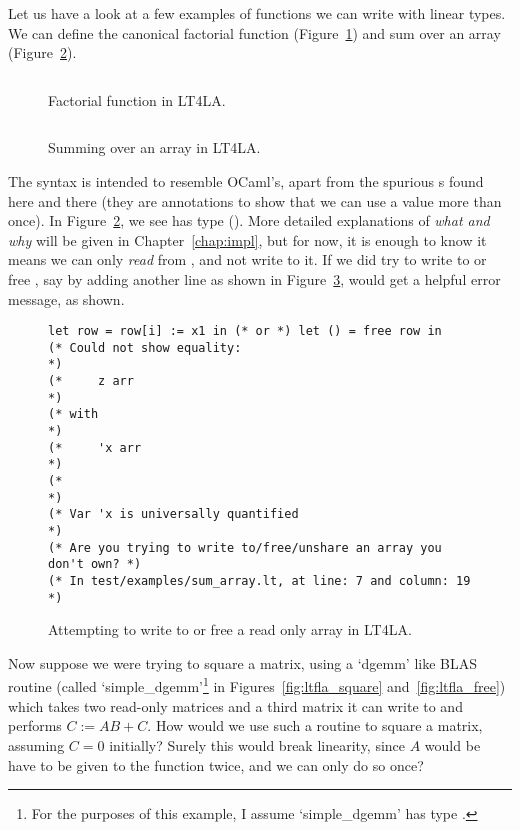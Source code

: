 Let us have a look at a few examples of functions we can write with linear
types.  We can define the canonical factorial function
(Figure~\ref{fig:ltfla_factorial}) and sum over an array
(Figure~\ref{fig:ltfla_sumarray}).

\begin{figure}[tp]
    \inputminted[linenos, fontsize=\small]{ocaml}{../test/examples/factorial.lt}
    \caption{Factorial function in LT4LA.}\label{fig:ltfla_factorial}
\end{figure}

\begin{figure}[tp]
    \inputminted[linenos, fontsize=\small]{ocaml}{../test/examples/sum_array.lt}
    \caption{Summing over an array in LT4LA.}\label{fig:ltfla_sumarray}
\end{figure}

The syntax is intended to resemble OCaml's, apart from the spurious
s found here and there (they are annotations to show that we can
use a value more than once). In Figure~\ref{fig:ltfla_sumarray}, we see
 has type (). More detailed explanations of
\emph{what and why} will be given in Chapter~\ref{chap:impl}, but for now, it
is enough to know it means we can only \emph{read} from , and not
write to it. If we did try to write to or free , say by adding
another line as shown in Figure~\ref{fig:ltfla_univ}, would get a helpful error
message, as shown.

\begin{figure}[tp]
    \begin{verbatim}
let row = row[i] := x1 in (* or *) let () = free row in
(* Could not show equality:                                        *)
(*     z arr                                                       *)
(* with                                                            *)
(*     'x arr                                                      *)
(*                                                                 *)
(* Var 'x is universally quantified                                *)
(* Are you trying to write to/free/unshare an array you don't own? *)
(* In test/examples/sum_array.lt, at line: 7 and column: 19        *)
    \end{verbatim}
    \caption{Attempting to write to or free a read only array in
    LT4LA.}\label{fig:ltfla_univ}
\end{figure}

Now suppose we were trying to square a matrix, using a `dgemm' like BLAS
routine (called `simple\_dgemm'\footnote{For the purposes of this example, I
assume `simple\_dgemm' has type .} in Figures~\ref{fig:ltfla_square}
and~\ref{fig:ltfla_free}) which takes two read-only matrices and a third matrix
it can write to and performs $C := AB + C$. How would we use such a routine to
square a matrix, assuming $C=0$ initially?  Surely this would break linearity,
since $A$ would be have to be given to the function twice, and we can only do
so once?


